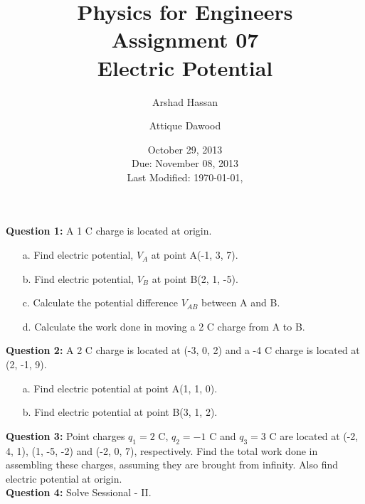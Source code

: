 \documentclass[12pt,a4paper]{article}
\title{\vspace{-3cm}Physics for Engineers\\Assignment 07\\Electric Potential}
\author{Arshad Hassan\and Attique Dawood}
\date{October 29, 2013\\Due: November 08, 2013\\[0.2cm] Last Modified: \today, \currenttime}
\begin{document}
\maketitle
\noindent\textbf{Question 1:} A 1 C charge is located at origin.
\begin{itemize}
\item[a.] Find electric potential, $V_A$ at point A(-1, 3, 7).
\item[b.] Find electric potential, $V_B$ at point B(2, 1, -5).
\item[c.] Calculate the potential difference $V_{AB}$ between A and B.
\item[d.] Calculate the work done in moving a 2 C charge from A to B.
\end{itemize}
\noindent\textbf{Question 2:} A 2 C charge is located at (-3, 0, 2) and a -4 C charge is located at (2, -1, 9).
\begin{itemize}
\item[a.] Find electric potential at point A(1, 1, 0).
\item[b.] Find electric potential at point B(3, 1, 2).
\end{itemize}
\noindent\textbf{Question 3:} Point charges $q_1=2$ C, $q_2=-1$ C and $q_3=3$ C are located at (-2, 4, 1), (1, -5, -2) and (-2, 0, 7), respectively. Find the total work done in assembling these charges, assuming they are brought from infinity. Also find electric potential at origin.\\[0.2cm]
\noindent\textbf{Question 4:} Solve Sessional - II.
%
%
\end{document}
